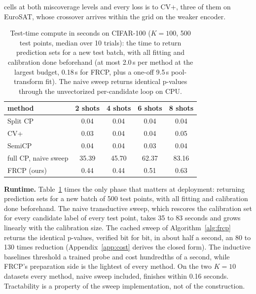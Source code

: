 cells at both miscoverage levels and every loss is to CV+, three of
them on EuroSAT, whose crossover arrives within the grid on the weaker
encoder.
\begin{table}[t]
\caption{Test-time compute in seconds on CIFAR-100 ($K = 100$, 500
test points, median over 10 trials): the time to return prediction
sets for a new test batch, with all fitting and calibration done
beforehand (at most 2.0\,s per method at the largest budget, 0.18\,s
for FRCP, plus a one-off 9.5\,s pool-transform fit). The naive sweep
returns identical p-values through the unvectorized per-candidate
loop on CPU.}
\label{tab:runtime-cifar100}
\begin{center}
\small
\setlength{\tabcolsep}{5pt}
\begin{tabular}{lcccc}
\toprule
method & 2 shots & 4 shots & 6 shots & 8 shots\\
\midrule
Split CP & 0.04 & 0.04 & 0.04 & 0.04\\
CV+ & 0.03 & 0.04 & 0.04 & 0.05\\
SemiCP & 0.04 & 0.04 & 0.03 & 0.04\\
full CP, naive sweep & 35.39 & 45.70 & 62.37 & 83.16\\
FRCP (ours) & 0.44 & 0.44 & 0.51 & 0.63\\
\bottomrule
\end{tabular}
\end{center}
\end{table}
\textbf{Runtime.} Table~\ref{tab:runtime-cifar100} times the only
phase that matters at deployment: returning prediction sets for a new
batch of 500 test points, with all fitting and calibration done
beforehand. The naive transductive sweep, which rescores the
calibration set for every candidate label of every test point, takes
35 to 83 seconds and grows linearly with the calibration size. The
cached sweep of Algorithm~\ref{alg:frcp} returns the identical
p-values, verified bit for bit, in about half a second, an 80 to 130
times reduction (Appendix~\ref{app:cost} derives the closed form).
The inductive baselines threshold a trained probe and cost hundredths
of a second, while FRCP's preparation side is the lightest of every
method. On the two $K = 10$ datasets every method, naive sweep
included, finishes within 0.16 seconds. Tractability is a property of
the sweep implementation, not of the construction.
